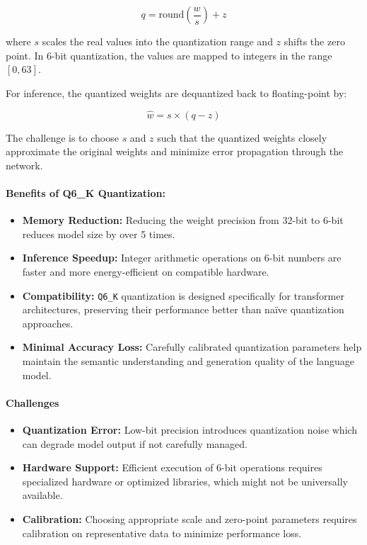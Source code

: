 \begin{equation*}
q = \text{round}\left(\frac{w}{s}\right) + z
\end{equation*}

where $s$ scales the real values into the quantization range and $z$ shifts the zero point. In 6-bit quantization, the values are mapped to integers in the range $[0, 63]$.

For inference, the quantized weights are dequantized back to floating-point by:

\begin{equation*}
\hat{w} = s \times (q - z)
\end{equation*}

The challenge is to choose $s$ and $z$ such that the quantized weights closely approximate the original weights and minimize error propagation through the network.

\paragraph{Benefits of Q6\_K Quantization:}
\begin{itemize}
    \item \textbf{Memory Reduction:} Reducing the weight precision from 32-bit to 6-bit reduces model size by over 5 times.
    
    \item \textbf{Inference Speedup:} Integer arithmetic operations on 6-bit numbers are faster and more energy-efficient on compatible hardware.
    
    \item \textbf{Compatibility:} \texttt{Q6\_K} quantization is designed specifically for transformer architectures, preserving their performance better than naïve quantization approaches.
    
    \item \textbf{Minimal Accuracy Loss:} Carefully calibrated quantization parameters help maintain the semantic understanding and generation quality of the language model.
\end{itemize}

\paragraph{Challenges}
\begin{itemize}
    \item \textbf{Quantization Error:} Low-bit precision introduces quantization noise which can degrade model output if not carefully managed.
    
    \item \textbf{Hardware Support:} Efficient execution of 6-bit operations requires specialized hardware or optimized libraries, which might not be universally available.
    
    \item \textbf{Calibration:} Choosing appropriate scale and zero-point parameters requires calibration on representative data to minimize performance loss.
\end{itemize}

